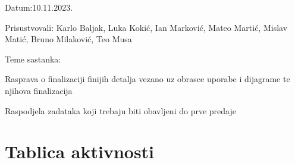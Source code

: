\begin{packed_enum}
			\item[] \begin{packed_item}
				\item Datum:10.11.2023.
				\item Prisustvovali: Karlo Baljak, Luka Kokić, Ian Marković, Mateo Martić, Mislav Matić, Bruno Milaković, Teo Musa
				\item Teme sastanka:
				\begin{packed_item}
					\item  Rasprava o finalizaciji finijih detalja vezano uz obrasce uporabe i dijagrame te njihova finalizacija
					\item  Raspodjela zadataka koji trebaju biti obavljeni do prve predaje
				\end{packed_item}
			\end{packed_item}
			
			
		\end{packed_enum}
		
		\eject
		\section*{Tablica aktivnosti}

